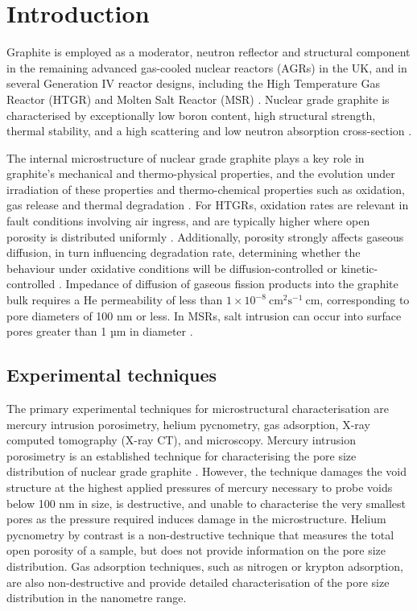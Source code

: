 \documentclass[review]{elsarticle}
\begin{document}
\section{Introduction}
Graphite is employed as a moderator, neutron reflector and structural component
in the remaining advanced gas-cooled nuclear reactors (AGRs) in the UK, and in
several Generation IV reactor designs, including the High Temperature Gas
Reactor (HTGR) and Molten Salt Reactor (MSR) \citep{international2025iaea,
international2023iaeaMSRs, MARSDENgeniv}. Nuclear grade graphite  is
characterised by exceptionally low boron content, high structural strength,
thermal stability, and a high scattering and low neutron absorption cross-section
\citep{Marsden2016}. 

The internal microstructure of nuclear grade graphite plays a key role in graphite's
mechanical and thermo-physical properties, and the evolution under irradiation
of these properties and thermo-chemical properties such as oxidation, gas
release and thermal degradation \citep{MARSDENgeniv, ARREGUIMENA2022112047}. For
HTGRs, oxidation rates are relevant in fault conditions involving air ingress,
and are typically higher where open porosity is distributed uniformly
\citep{PAUL2022132,GraphitePIRT}. Additionally, porosity strongly affects
gaseous diffusion, in turn influencing degradation rate, determining whether the
behaviour under oxidative conditions will be diffusion-controlled or
kinetic-controlled \citep{KANE2018369, MATTHEWS2021111245, PAUL2022132}.
Impedance of diffusion of gaseous fission products into the graphite bulk
requires a He permeability of less than $1 \times
10^{-8}~\text{cm}^2\text{s}^{-1}~\text{cm}$, corresponding to pore diameters of
100 nm or less\citep{McCoy1970MoltenSalt, SONG201436}. In MSRs, salt
intrusion can occur into surface pores greater than 1 µm in diameter
\citep{McCoy1970MoltenSalt}. 



\subsection{Experimental techniques}
\label{subsec:Experimental techniques}
The primary experimental techniques for microstructural characterisation are
mercury intrusion porosimetry, helium pycnometry, gas adsorption, X-ray computed
tomography (X-ray CT), and microscopy. Mercury intrusion porosimetry is an
established technique for characterising the pore size distribution of nuclear
grade graphite \citep{ARREGUIMENA2022112047, JONES2020256HgHe, CONTESCU2019663,
Jones2020}. However, the technique damages the void structure at the highest
applied pressures of mercury necessary to probe voids below 100 nm in size, is
destructive, and unable to characterise the very smallest pores as the pressure
required induces damage in the microstructure. Helium pycnometry by contrast is
a non-destructive technique that measures the total open porosity of a sample,
but does not provide information on the pore size distribution. Gas adsorption
techniques, such as nitrogen or krypton adsorption, are also non-destructive and
provide detailed characterisation of the pore size distribution in the nanometre
range.
\end{document}

